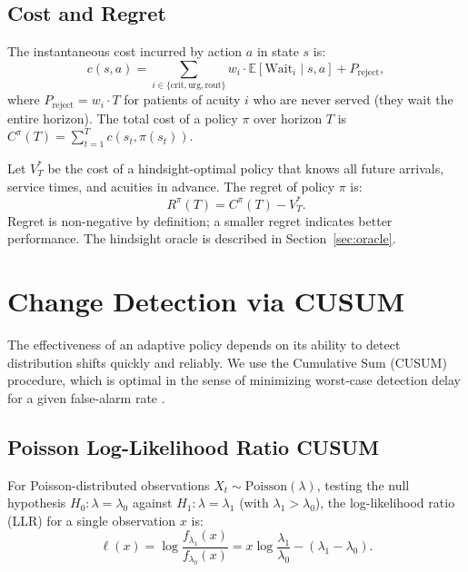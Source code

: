 \documentclass[11pt,twocolumn]{article}
\theoremstyle{plain}
\theoremstyle{definition}
\begin{document}
\subsection{Cost and Regret}

The instantaneous cost incurred by action $a$ in state $s$ is:
\begin{equation}
c(s, a) = \sum_{i \in \{\text{crit},\text{urg},\text{rout}\}} w_i \cdot \mathbb{E}[\text{Wait}_i \mid s, a] + P_{\text{reject}},
\label{eq:cost}
\end{equation}
where $P_{\text{reject}} = w_i \cdot T$ for patients of acuity $i$ who are never served (they wait the entire horizon). The total cost of a policy $\pi$ over horizon $T$ is $C^{\pi}(T) = \sum_{t=1}^{T} c(s_t, \pi(s_t))$.

Let $V^*_T$ be the cost of a hindsight-optimal policy that knows all future arrivals, service times, and acuities in advance. The regret of policy $\pi$ is:
\begin{equation}
R^{\pi}(T) = C^{\pi}(T) - V^*_T.
\label{eq:regret}
\end{equation}
Regret is non-negative by definition; a smaller regret indicates better performance. The hindsight oracle is described in Section~\ref{sec:oracle}.

\section{Change Detection via CUSUM}
\label{sec:cusum}

The effectiveness of an adaptive policy depends on its ability to detect distribution shifts quickly and reliably. We use the Cumulative Sum (CUSUM) procedure, which is optimal in the sense of minimizing worst-case detection delay for a given false-alarm rate \cite{lorden1971procedures,moustakides1986optimal}.

\subsection{Poisson Log-Likelihood Ratio CUSUM}

For Poisson-distributed observations $X_t \sim \text{Poisson}(\lambda)$, testing the null hypothesis $H_0: \lambda = \lambda_0$ against $H_1: \lambda = \lambda_1$ (with $\lambda_1 > \lambda_0$), the log-likelihood ratio (LLR) for a single observation $x$ is:
\begin{equation}
\ell(x) = \log\frac{f_{\lambda_1}(x)}{f_{\lambda_0}(x)} = x \log\frac{\lambda_1}{\lambda_0} - (\lambda_1 - \lambda_0).
\label{eq:llr}
\end{equation}
\end{document}
